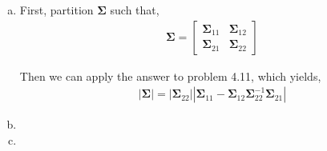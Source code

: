 \documentclass[12pt]{article}\usepackage[]{graphicx}\usepackage[]{color}
\newenvironment{problem}[2][Problem]{\begin{trivlist}
\item[\hskip \labelsep {\bfseries #1}\hskip \labelsep {\bfseries #2.}]}{\end{trivlist}}
\newcommand{\vct}{\mathbf}
\begin{document}

\begin{problem}{4.12}
\end{problem}


\begin{problem}{4.13}
\end{problem}

\begin{enumerate}[a)]

\item First, partition $\vct{\Sigma}$ such that,
\begin{align*}
\vct{\Sigma} = \begin{bmatrix} \vct{\Sigma}_{11} & \vct{\Sigma}_{12} \\ \vct{\Sigma}_{21} & \vct{\Sigma}_{22} \end{bmatrix}
\end{align*}

Then we can apply the answer to problem 4.11, which yields,
\begin{align*}
|\vct{\Sigma}| = |\vct{\Sigma}_{22}||\vct{\Sigma}_{11} - \vct{\Sigma}_{12}\vct{\Sigma}_{22}^{-1}\vct{\Sigma}_{21}|
\end{align*}

\item 

\item

\end{enumerate}


\begin{problem}{4.14}
\end{problem}


\begin{problem}{4.15}
\end{problem}

\end{document}
